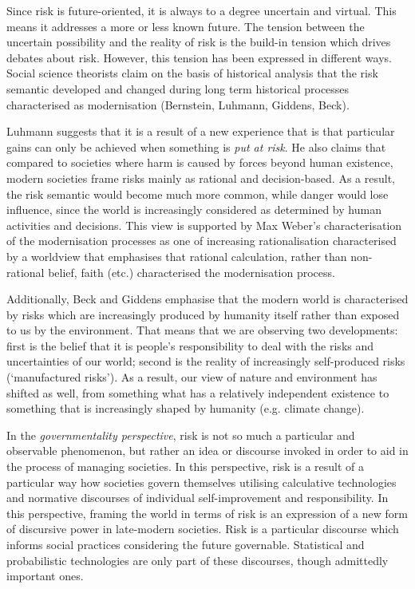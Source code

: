 \documentclass{report}
\begin{document}
Since risk is future-oriented, it is always to a degree uncertain and virtual. This means it addresses a more or less known future. The tension between the uncertain possibility and the reality of risk is the build-in tension which drives debates about risk. However, this tension has been expressed in different ways. Social science theorists claim on the basis of historical analysis that the risk semantic developed and changed during long term historical processes characterised as modernisation (Bernstein, Luhmann, Giddens, Beck).

Luhmann suggests that it is a result of a new experience that is that particular gains can only be achieved when something is \emph{put at risk}. He also claims that compared to societies where harm is caused by forces beyond human existence, modern societies frame risks mainly as rational and decision-based. As a result, the risk semantic would become much more common, while danger would lose influence,  since the world is increasingly considered as determined by human activities and decisions. This view is supported by Max Weber's characterisation of the modernisation processes as one of increasing rationalisation characterised by a worldview that emphasises that rational calculation, rather than non-rational belief, faith (etc.) characterised the modernisation process. 


Additionally, Beck and Giddens emphasise that the modern world is characterised by risks which are increasingly produced by humanity itself rather than exposed to us by the environment. That means that we are observing two developments: first is the belief that it is people's responsibility to deal with the risks and uncertainties of our world; second is the reality of increasingly self-produced risks (`manufactured risks'). As a result, our view of nature and environment has shifted as well, from something what has a relatively independent existence to something that is increasingly shaped by humanity (e.g. climate change).

In the \emph{governmentality perspective}, risk is not so much a particular and observable phenomenon, but rather an idea or discourse invoked in order to aid in the process of managing societies. In this perspective, risk is a result of a particular way how societies govern themselves utilising calculative technologies and normative discourses of individual self-improvement and responsibility. In this perspective, framing the world in terms of risk is an expression of a new form of discursive power in late-modern societies. Risk is a particular discourse which informs social practices considering the future governable. Statistical and probabilistic technologies are only part of these discourses, though admittedly important ones.
\end{document}
